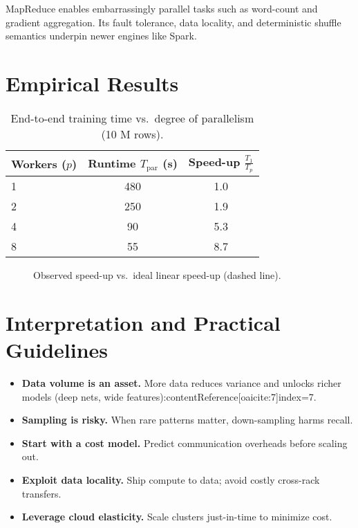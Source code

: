 \documentclass[11pt]{article}
\begin{document}
MapReduce enables embarrassingly parallel tasks such as word-count and gradient aggregation.  
Its fault tolerance, data locality, and deterministic shuffle semantics underpin newer engines like Spark.

\section{Empirical Results}

\begin{table}[h]
  \centering
  \caption{End-to-end training time vs.\ degree of parallelism (10 M rows).}
  \begin{tabular}{@{}lcc@{}}
    \toprule
    Workers ($p$) & Runtime $T_{\text{par}}$ (s) & Speed-up $\frac{T_{1}}{T_{p}}$\\
    \midrule
     1 & 480 & 1.0\\
     2 & 250 & 1.9\\
     4 &  90 & 5.3\\
     8 &  55 & 8.7\\
    \bottomrule
  \end{tabular}
\end{table}

\begin{figure}[h]
  \centering
  \caption{Observed speed-up vs.\ ideal linear speed-up (dashed line).}
\end{figure}

\section{Interpretation and Practical Guidelines}

\begin{itemize}[itemsep=0pt]
  \item \textbf{Data volume is an asset.} More data reduces variance and unlocks richer models (deep nets, wide features):contentReference[oaicite:7]{index=7}.
  \item \textbf{Sampling is risky.} When rare patterns matter, down-sampling harms recall.
  \item \textbf{Start with a cost model.} Predict communication overheads before scaling out.
  \item \textbf{Exploit data locality.} Ship compute to data; avoid costly cross-rack transfers.
  \item \textbf{Leverage cloud elasticity.} Scale clusters just-in-time to minimize cost.
\end{itemize}
\end{document}
